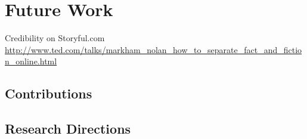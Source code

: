 

\chapter{Future Work}

\ifpdf
    \graphicspath{{11_future_work/figures/PNG/}{11_future_work/figures/PDF/}{11_future_work/figures/}}
\else
    \graphicspath{{11_future_work/figures/EPS/}{11_future_work/figures/}}
\fi


Credibility on Storyful.com \url{http://www.ted.com/talks/markham_nolan_how_to_separate_fact_and_fiction_online.html}

\section{Contributions}

\section{Research Directions}





